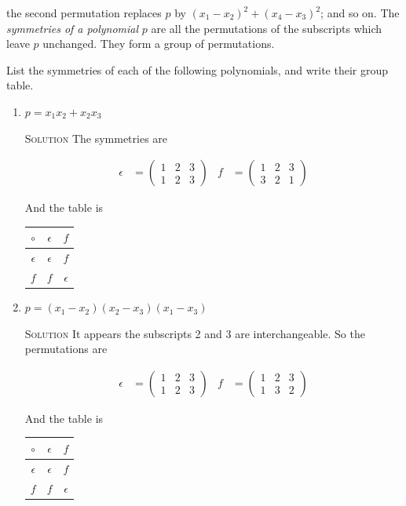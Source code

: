 \documentclass[twoside]{amsart}
\newcommand{\solution}{\textsc{Solution}\xspace}
\newcommand{\eps}{\ensuremath{\epsilon}\xspace}
\begin{document}
\begin{enumerate}[A.]
   \noindent the second permutation replaces $p$ by 
   $(x_1 - x_2)^2 + (x_4 - x_3)^2$; and so on. The \emph{symmetries of
   a polynomial} $p$ are all the permutations of the subscripts which
   leave $p$ unchanged. They form a group of permutations.

   List the symmetries of each of the following polynomials, and write 
   their group table.

   \begin{enumerate}[1]
      \item $p=x_1x_2 + x_2x_3$

      \noindent \solution The symmetries are 

      \begin{align*}
         \eps &= \begin{pmatrix}
	            1 & 2 & 3 \\
		    1 & 2 & 3
		 \end{pmatrix}
		 &
	 f    &= \begin{pmatrix}
	            1 & 2 & 3 \\
		    3 & 2 & 1
		 \end{pmatrix}
      \end{align*}

      And the table is 
      \begin{tabular}{c|cc}
         $\circ$ & $\eps$ & $f$ \\ \hline
	 $\eps$  & $\eps$ & $f$ \\
	 $f$     & $f$ & $\eps$
      \end{tabular}

      \vspace{5pt}
      \item $p = (x_1 - x_2)(x_2 - x_3)(x_1 - x_3)$
      
      \noindent \solution It appears the subscripts 2 and 3 are 
      interchangeable. So the permutations are

      \begin{align*}
         \eps &= \begin{pmatrix}
	            1 & 2 & 3 \\
		    1 & 2 & 3
		 \end{pmatrix}
		 &
	 f    &= \begin{pmatrix}
	            1 & 2 & 3 \\
		    1 & 3 & 2
		 \end{pmatrix}
      \end{align*}

      And the table is 
      \begin{tabular}{c|cc}
         $\circ$ & $\eps$ & $f$ \\ \hline
	 $\eps$  & $\eps$ & $f$ \\
	 $f$     & $f$ & $\eps$
      \end{tabular}



\end{enumerate}
\end{enumerate}
\end{document}
